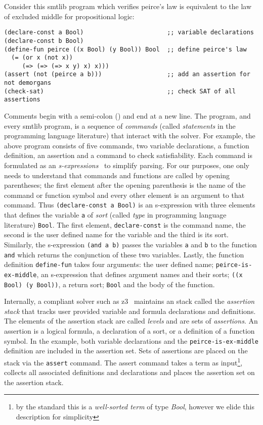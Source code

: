 Consider this \acl{smtlib} program
which verifies peirce's law is equivalent to the law of excluded middle for
propositional logic:
%
\begin{lstlisting}[columns=flexible,keepspaces=true,language=SMTLIB]
(declare-const a Bool)                       ;; variable declarations
(declare-const b Bool)
(define-fun peirce ((x Bool) (y Bool)) Bool  ;; define peirce's law
  (= (or x (not x))
     (=> (=> (=> x y) x) x)))
(assert (not (peirce a b)))                  ;; add an assertion for not demorgans
(check-sat)                                  ;; check SAT of all assertions
\end{lstlisting}
%
Comments begin with a semi-colon (\rn{;}) and end at a new line. The program,
and every \acl{smtlib} program, is a sequence of \emph{commands} (called
\emph{statements} in the programming language literature) that interact with the
solver. For example, the above program consists of five commands, two variable
declarations, a function definition, an assertion and a command to check
satisfiability. Each command is formulated as an
\emph{s-expressions}~\cite{10.1145/367177.367199} to simplify parsing. For our
purposes, one only needs to understand that commands and functions are called by
opening parentheses; the first element after the opening parenthesis is the name
of the command or function symbol and every other element is an argument to that
command. Thus \lstinline{(declare-const a Bool)} is an s-expression with three
elements that defines the \pl{} variable \lstinline{a} of \emph{sort} (called
\emph{type} in programming language literature) \lstinline{Bool}. The first
element, \lstinline{declare-const} is the command name, the second is the user
defined name for the variable and the third is its sort. Similarly, the
s-expression \lstinline{(and a b)} passes the variables \lstinline{a} and
\lstinline{b} to the function \lstinline{and} which returns the conjunction of
these two variables. Lastly, the function definition \lstinline{define-fun}
takes four arguments: the user defined name; \lstinline{peirce-is-ex-middle}, an
s-expression that defines argument names and their sorts;
\lstinline{((x Bool) (y Bool))}, a return sort; \lstinline{Bool} and the body of
the function.

Internally, a compliant solver such as z3~\cite{10.1007/978-3-540-78800-3_24}
maintains an stack called the \emph{assertion stack} that tracks user provided
variable and formula declarations and definitions. The elements of the assertion
stack are called \emph{levels} and are sets of \emph{assertions}.
%
An assertion is a logical formula, a declaration of a sort, or a definition of a
function symbol. In the example, both variable declarations and the
\lstinline{peirce-is-ex-middle} definition are included in the assertion set.
Sets of assertions are placed on the stack via the \lstinline{assert} command.
The assert command takes a term as input\footnote{by the standard this is a
  \emph{well-sorted term} of type \emph{Bool}, however we elide this description
  for simplicity}, collects all associated definitions and declarations and
places the assertion set on the assertion stack.

